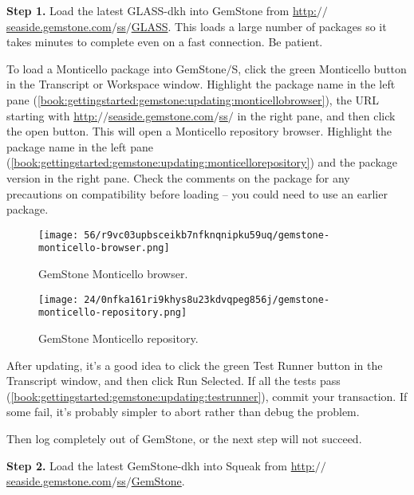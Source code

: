 \documentclass[a4paper,10pt,twoside]{book}
\begin{document}
\textbf{Step 1.} Load the latest GLASS-dkh into GemStone from \href{http://seaside.gemstone.com/ss/GLASS}{http:$/$$/$seaside.gemstone.com$/$ss$/$GLASS}. This loads a large number of packages so it takes minutes to complete even on a fast connection. Be patient.

To load a Monticello package into GemStone$/$S, click the green Monticello button in the Transcript or Workspace window. Highlight the package name in the left pane (\autoref{book:gettingstarted:gemstone:updating:monticellobrowser}), the URL starting with \href{http://seaside.gemstone.com/ss/}{http:$/$$/$seaside.gemstone.com$/$ss$/$} in the right pane, and then click the open button. This will open a Monticello repository browser. Highlight the package name in the left pane (\autoref{book:gettingstarted:gemstone:updating:monticellorepository}) and the package version in the right pane. Check the comments on the package for any precautions on compatibility before loading -- you could need to use an earlier package.

\begin{figure}[h!tbp]
	\begin{center}
		\texttt{[image: 56/r9vc03upbsceikb7nfknqnipku59uq/gemstone-monticello-browser.png]}
		\caption{GemStone Monticello browser.\label{book:gettingstarted:gemstone:updating:monticellobrowser}}
	\end{center}
\end{figure}


\begin{figure}[h!tbp]
	\begin{center}
		\texttt{[image: 24/0nfka161ri9khys8u23kdvqpeg856j/gemstone-monticello-repository.png]}
		\caption{GemStone Monticello repository.\label{book:gettingstarted:gemstone:updating:monticellorepository}}
	\end{center}
\end{figure}


After updating, it's a good idea to click the green Test Runner button in the Transcript window, and then click Run Selected. If all the tests pass (\autoref{book:gettingstarted:gemstone:updating:testrunner}), commit your transaction. If some fail, it's probably simpler to abort rather than debug the problem. 

Then log completely out of GemStone, or the next step will not succeed.

\textbf{Step 2.} Load the latest GemStone-dkh into Squeak from
\href{http://seaside.gemstone.com/ss/GemStone}{http:$/$$/$seaside.gemstone.com$/$ss$/$GemStone}. 
\end{document}
